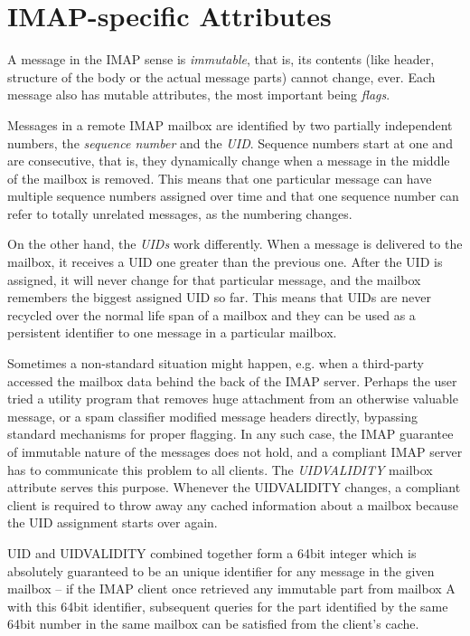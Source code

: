 \documentclass[12pt,notitlepage]{report}
\begin{document}
\section{IMAP-specific Attributes}

A message in the IMAP sense is {\em immutable}, that is, its contents (like
header, structure of the body or the actual message parts) cannot change, ever.
Each message also has mutable attributes, the most important being {\em flags}.

Messages in a remote IMAP mailbox are identified by two partially independent
numbers, the {\em sequence number} and the {\em UID}.  Sequence numbers start at
one and are consecutive, that is, they dynamically change when a message in the
middle of the mailbox is removed.  This means that one particular message can
have multiple sequence numbers assigned over time and that one sequence number
can refer to totally unrelated messages, as the numbering changes.

On the other hand, the {\em UIDs} work differently.  When a message is delivered
to the mailbox, it receives a UID one greater than the previous one.  After the
UID is assigned, it will never change for that particular message, and the
mailbox remembers the biggest assigned UID so far.  This means that UIDs are
never recycled over the normal life span of a mailbox and they can be used as a
persistent identifier to one message in a particular mailbox.

Sometimes a non-standard situation might happen, e.g. when a third-party
accessed the mailbox data behind the back of the IMAP server.  Perhaps the user
tried a utility program that removes huge attachment from an otherwise valuable
message, or a spam classifier modified message headers directly, bypassing
standard mechanisms for proper flagging.  In any such case, the IMAP guarantee
of immutable nature of the messages does not hold, and a compliant IMAP server
has to communicate this problem to all clients.  The {\em UIDVALIDITY} mailbox
attribute serves this purpose.  Whenever the UIDVALIDITY changes, a compliant
client is required to throw away any cached information about a mailbox because
the UID assignment starts over again.

UID and UIDVALIDITY combined together form a 64bit integer which is absolutely
guaranteed to be an unique identifier for any message in the given mailbox -- if
the IMAP client once retrieved any immutable part from mailbox A with this 64bit
identifier, subsequent queries for the part identified by the same 64bit number
in the same mailbox can be satisfied from the client's cache.
\end{document}
